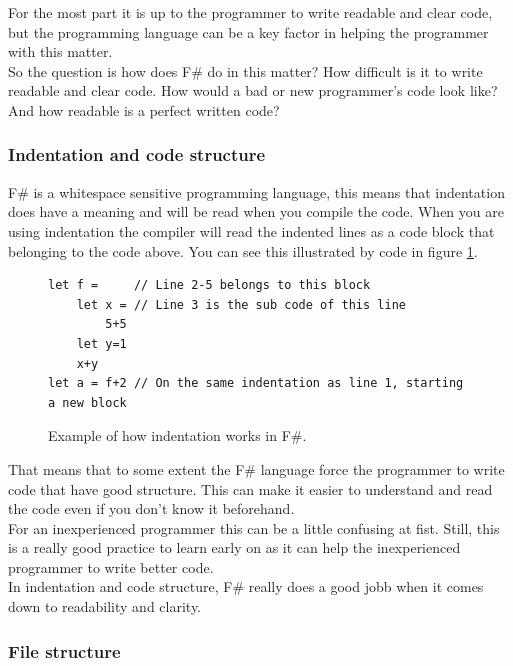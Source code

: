 \documentclass[12pt, a4paper]{article}
\begin{document}
For the most part it is up to the programmer to write readable and clear code, but the programming language can be a key factor in helping the programmer with this matter.\\

So the question is how does F\# do in this matter? How difficult is it to write readable and clear code. How would a bad or new programmer's code look like? And how readable is a perfect written code?

\newpage
\subsubsection{Indentation and code structure}
\label{indentationAndCodeStructure}
F\# is a whitespace sensitive programming language, this means that indentation does have a meaning and will be read when you compile the code. When you are using indentation the compiler will read the indented lines as a code block that belonging to the code above. You can see this illustrated by code in figure \ref{fig:indentationExample}.

\begin{figure}[!h]
	\begin{lstlisting}
let f = 	// Line 2-5 belongs to this block
	let x = // Line 3 is the sub code of this line
		5+5	
	let y=1
  	x+y
let a = f+2	// On the same indentation as line 1, starting a new block
	\end{lstlisting}
	\caption{Example of how indentation works in F\#.}
	\label{fig:indentationExample}
\end{figure}

That means that to some extent the F\# language force the programmer to write code that have good structure. This can make it easier to understand and read the code even if you don't know it beforehand.\\

For an inexperienced programmer this can be a little confusing at fist. Still, this is a really good practice to learn early on as it can help the inexperienced programmer to write better code.\\

In indentation and code structure, F\# really does a good jobb when it comes down to readability and clarity.

\newpage
\subsubsection{File structure}
\end{document}
